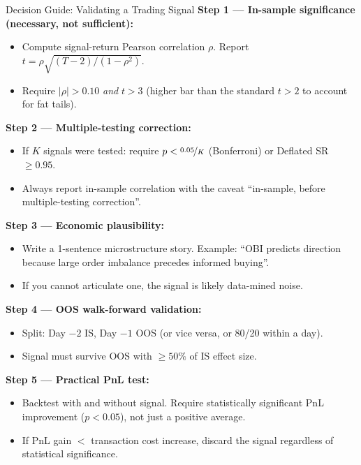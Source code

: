 \documentclass[12pt,a4paper,openany]{report}
\theoremstyle{definition}
\begin{document}
\begin{keyconceptbox}{Decision Guide: Validating a Trading Signal}
\textbf{Step 1 — In-sample significance (necessary, not sufficient):}
\begin{itemize}
  \item Compute signal-return Pearson correlation $\rho$. Report $t = \rho\sqrt{(T-2)/(1-\rho^2)}$.
  \item Require $|\rho| > 0.10$ \emph{and} $t > 3$ (higher bar than the standard $t > 2$ to account for fat tails).
\end{itemize}
\textbf{Step 2 — Multiple-testing correction:}
\begin{itemize}
  \item If $K$ signals were tested: require $p < \nicefrac{0.05}{K}$ (Bonferroni) or Deflated SR $\geq 0.95$.
  \item Always report in-sample correlation with the caveat ``in-sample, before multiple-testing correction''.
\end{itemize}
\textbf{Step 3 — Economic plausibility:}
\begin{itemize}
  \item Write a 1-sentence microstructure story. Example: ``OBI predicts direction because large order imbalance precedes informed buying''.
  \item If you cannot articulate one, the signal is likely data-mined noise.
\end{itemize}
\textbf{Step 4 — OOS walk-forward validation:}
\begin{itemize}
  \item Split: Day $-2$ IS, Day $-1$ OOS (or vice versa, or 80/20 within a day).
  \item Signal must survive OOS with $\geq 50\%$ of IS effect size.
\end{itemize}
\textbf{Step 5 — Practical PnL test:}
\begin{itemize}
  \item Backtest with and without signal. Require statistically significant PnL improvement ($p < 0.05$), not just a positive average.
  \item If PnL gain $<$ transaction cost increase, discard the signal regardless of statistical significance.
\end{itemize}
\end{keyconceptbox}


%
%
\end{document}
